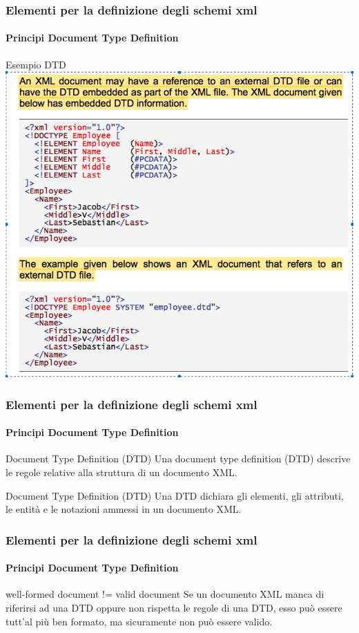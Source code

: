 \begin{frame}
    \frametitle{Elementi per la definizione degli schemi xml}
    \framesubtitle{Principi Document Type Definition}
    \addtocounter{nframe}{1}

    \begin{block}{Esempio DTD}
        \includegraphics[width=.8\textwidth]{imgs/dtd.png}
    \end{block}
\end{frame}

\begin{frame}
    \frametitle{Elementi per la definizione degli schemi xml}
    \framesubtitle{Principi Document Type Definition}
    \addtocounter{nframe}{1}

    \begin{block}{Document Type Definition (DTD)}
        Una document type definition (DTD) descrive le regole relative alla struttura di un documento XML.
    \end{block}

    \begin{block}{Document Type Definition (DTD)}
        Una DTD dichiara gli elementi, gli attributi, le entità e le notazioni ammessi in un documento XML.
    \end{block}

\end{frame}


\begin{frame}
    \frametitle{Elementi per la definizione degli schemi xml}
    \framesubtitle{Principi Document Type Definition}
    \addtocounter{nframe}{1}

    \begin{block}{well-formed document != valid document}
         Se un documento XML manca di riferirsi ad una DTD oppure non rispetta le regole di una DTD, esso può essere tutt'al più ben formato, ma sicuramente non può essere valido.
    \end{block}
\end{frame}

